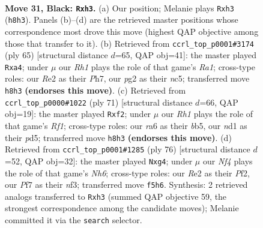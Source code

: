 \documentclass[11pt]{article}
\begin{document}
\clearpage

\begin{figure}[p]\centering
\begin{subfigure}{0.46\textwidth}\centering
\resizebox{\linewidth}{!}{%
\newchessgame
\chessboard[
  setfen={b3k2r/P4p2/R5p1/4Pn2/5K2/5N1R/4r1P1/3N4 b k - 8 31},
  showmover=false,
  pgfstyle=straightmove, color=movearrow, markmove={h8-h3}
]}
\caption{}
\end{subfigure}\hfill
\begin{subfigure}{0.46\textwidth}\centering
\resizebox{\linewidth}{!}{%
\newchessgame
\chessboard[
  setfen={r5k1/7p/2p5/2Nnp1P1/R2PK3/3R2P1/1r5P/8 b - - 0 33},
  showmover=false,
  pgfstyle=straightmove, color=movearrow, markmove={a8-a4}
]}
\caption{}
\end{subfigure}
\\[4pt]
\begin{subfigure}{0.46\textwidth}\centering
\resizebox{\linewidth}{!}{%
\newchessgame
\chessboard[
  setfen={5r1k/8/3r2p1/1B1Pp1bp/4R3/7P/1P3RP1/6K1 b - - 0 36},
  showmover=false,
  pgfstyle=straightmove, color=movearrow, markmove={f8-f2}
]}
\caption{}
\end{subfigure}\hfill
\begin{subfigure}{0.46\textwidth}\centering
\resizebox{\linewidth}{!}{%
\newchessgame
\chessboard[
  setfen={2r5/6kp/7N/p6R/P3p1r1/5n2/5P1P/2R4K w - - 6 39},
  showmover=false,
  pgfstyle=straightmove, color=movearrow, markmove={h6-g4}
]}
\caption{}
\end{subfigure}
\caption{\textbf{Move 31, Black: \texttt{Rxh3}.} (a) Our position; Melanie plays \texttt{Rxh3} (\texttt{h8h3}). Panels (b)--(d) are the retrieved master positions whose correspondence most drove this move (highest QAP objective among those that transfer to it). (b) Retrieved from \texttt{ccrl\_top\_p0001\#3174} (ply 65) [structural distance $d$=65, QAP obj=41]: the master played \texttt{Rxa4}; under $\mu$ our \emph{Rh1} plays the role of that game's \emph{Ra1}; cross-type roles: our \emph{R}e2 as their \emph{P}h7, our \emph{p}g2 as their \emph{n}c5; transferred move \texttt{h8h3} \textbf{(endorses this move)}. (c) Retrieved from \texttt{ccrl\_top\_p0000\#1022} (ply 71) [structural distance $d$=66, QAP obj=19]: the master played \texttt{Rxf2}; under $\mu$ our \emph{Rh1} plays the role of that game's \emph{Rf1}; cross-type roles: our \emph{r}a6 as their \emph{b}b5, our \emph{n}d1 as their \emph{p}d5; transferred move \texttt{h8h3} \textbf{(endorses this move)}. (d) Retrieved from \texttt{ccrl\_top\_p0001\#1285} (ply 76) [structural distance $d$=52, QAP obj=32]: the master played \texttt{Nxg4}; under $\mu$ our \emph{Nf4} plays the role of that game's \emph{Nh6}; cross-type roles: our \emph{R}e2 as their \emph{P}f2, our \emph{P}f7 as their \emph{n}f3; transferred move \texttt{f5h6}. Synthesis: 2 retrieved analogs transferred to \texttt{Rxh3} (summed QAP objective 59, the strongest correspondence among the candidate moves); Melanie committed it via the \texttt{search} selector.}
\label{fig:thought-m61}
\end{figure}
\end{document}
